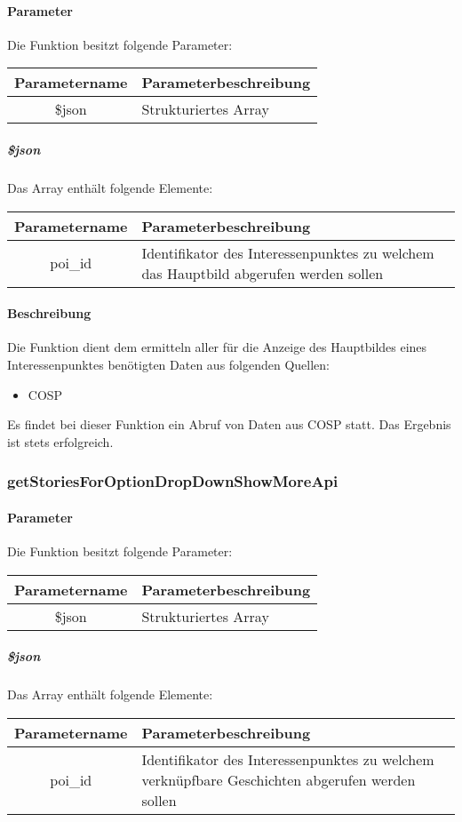 \paragraph{Parameter} Die Funktion besitzt folgende Parameter:
\begin{table}[H]
	\begin{tabular}{|c|p{11cm}|}
		\hline
		\textbf{Parametername} & \textbf{Parameterbeschreibung} \\ \hline
		\$json & Strukturiertes Array \\ \hline
	\end{tabular}
\end{table}
\subparagraph{\$json}Das Array enthält folgende Elemente:
\begin{table}[H]
	\begin{tabular}{|c|p{11cm}|}
		\hline
		\textbf{Parametername} & \textbf{Parameterbeschreibung} \\ \hline
		poi\_id & Identifikator des Interessenpunktes zu welchem das Hauptbild abgerufen werden sollen \\ \hline
	\end{tabular}
\end{table}
\paragraph{Beschreibung} Die Funktion dient dem ermitteln aller für die Anzeige des Hauptbildes eines Interessenpunktes benötigten Daten aus folgenden Quellen:
\begin{itemize}
	\item COSP
\end{itemize}
Es findet bei dieser Funktion ein Abruf von Daten aus {\glqq COSP\grqq} statt. Das Ergebnis ist stets erfolgreich.
\subsubsection{getStoriesForOptionDropDownShowMoreApi}
\paragraph{Parameter} Die Funktion besitzt folgende Parameter:
\begin{table}[H]
	\begin{tabular}{|c|p{11cm}|}
		\hline
		\textbf{Parametername} & \textbf{Parameterbeschreibung} \\ \hline
		\$json & Strukturiertes Array \\ \hline
	\end{tabular}
\end{table}
\subparagraph{\$json}Das Array enthält folgende Elemente:
\begin{table}[H]
	\begin{tabular}{|c|p{11cm}|}
		\hline
		\textbf{Parametername} & \textbf{Parameterbeschreibung} \\ \hline
		poi\_id & Identifikator des Interessenpunktes zu welchem verknüpfbare Geschichten abgerufen werden sollen \\ \hline
	\end{tabular}
\end{table}
